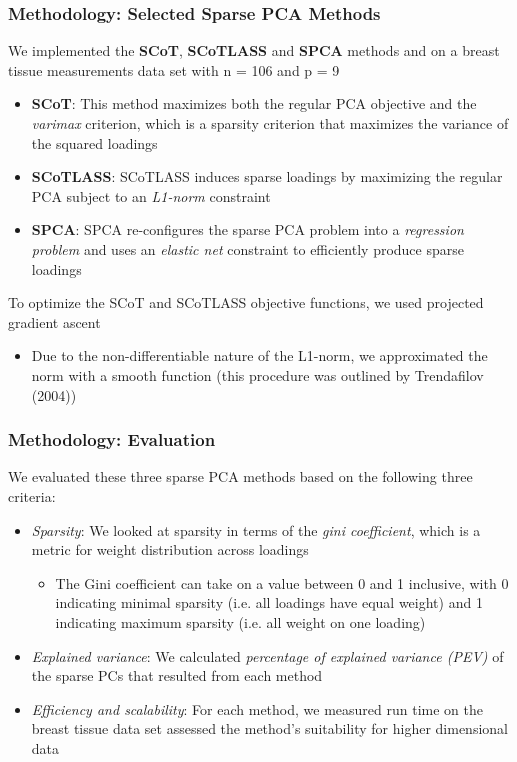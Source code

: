\documentclass[11pt]{beamer}
\begin{document}
\begin{frame}\frametitle{Methodology: Selected Sparse PCA Methods}
We implemented the \textbf{SCoT}, \textbf{SCoTLASS} and \textbf{SPCA} methods and on a breast tissue measurements data set with n = 106 and p = 9\\
\begin{itemize}
    \item \textbf{SCoT}: This method maximizes both the regular PCA objective and the \textit{varimax} criterion, which is a sparsity criterion that maximizes the variance of the squared loadings
    \item \textbf{SCoTLASS}: SCoTLASS induces sparse loadings by maximizing the regular PCA subject to an \textit{L1-norm} constraint
    \item \textbf{SPCA}: SPCA re-configures the sparse PCA problem into a \textit{regression problem} and uses an \textit{elastic net} constraint to efficiently produce sparse loadings 
\end{itemize}
To optimize the SCoT and SCoTLASS objective functions, we used projected gradient ascent
\begin{itemize}
    \item Due to the non-differentiable nature of the L1-norm, we approximated the norm with a smooth function (this procedure was outlined by Trendafilov (2004))
\end{itemize}
\end{frame}

\begin{frame}\frametitle{Methodology: Evaluation}
We evaluated these three sparse PCA methods based on the following three criteria:
\begin{itemize}
    \item \textit{Sparsity}: We looked at sparsity in terms of the \textit{gini coefficient}, which is a metric for weight distribution across loadings
        \begin{itemize}
            \item The Gini coefficient can take on a value between 0 and 1 inclusive, with 0 indicating minimal sparsity (i.e. all loadings have equal weight) and 1 indicating maximum sparsity (i.e. all weight on one loading)
        \end{itemize}
    \item \textit{Explained variance}: We calculated \textit{percentage of explained variance (PEV)} of the sparse PCs that resulted from each method
    \item \textit{Efficiency and scalability}: For each method, we measured run time on the breast tissue data set assessed the method's suitability for higher dimensional data
\end{itemize}
\end{frame}
\end{document}
